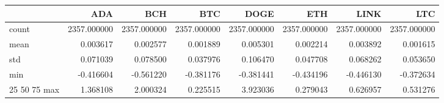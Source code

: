 \begin{tabular}{lrrrrrrr}
\toprule
 & ADA & BCH & BTC & DOGE & ETH & LINK & LTC \\
\midrule
count & 2357.000000 & 2357.000000 & 2357.000000 & 2357.000000 & 2357.000000 & 2357.000000 & 2357.000000 \\
mean & 0.003617 & 0.002577 & 0.001889 & 0.005301 & 0.002214 & 0.003892 & 0.001615 \\
std & 0.071039 & 0.078500 & 0.037976 & 0.106470 & 0.047708 & 0.068262 & 0.053650 \\
min & -0.416604 & -0.561220 & -0.381176 & -0.381441 & -0.434196 & -0.446130 & -0.372634 \\
25%
50%
75%
max & 1.368108 & 2.000324 & 0.225515 & 3.923036 & 0.279043 & 0.626957 & 0.531276 \\
\bottomrule
\end{tabular}
